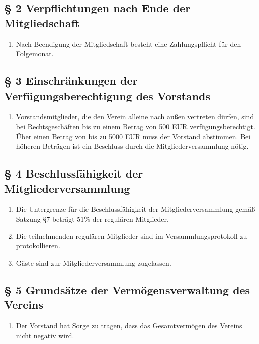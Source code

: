 \documentclass[10pt,a4paper]{article}
\begin{document}
%
%
\subsection*{§ 2 Verpflichtungen nach Ende der Mitgliedschaft}
\begin{enumerate}
\item Nach Beendigung der Mitgliedschaft besteht eine Zahlungspflicht für den Folgemonat.
\end{enumerate}
%
%
\subsection*{§ 3 Einschränkungen der Verfügungsberechtigung des Vorstands}
\begin{enumerate}
\item Vorstandsmitglieder, die den Verein alleine nach außen vertreten
    dürfen, sind bei Rechtsgeschäften bis zu einem Betrag von 500 EUR
    verfügungsberechtigt. Über einen Betrag von bis zu 5000 EUR muss der
    Vorstand abstimmen. Bei höheren Beträgen ist ein Beschluss durch die
    Mitgliederversammlung nötig.
\end{enumerate}
%
%
\subsection*{§ 4 Beschlussfähigkeit der Mitgliederversammlung}
\begin{enumerate}
\item Die Untergrenze für die Beschlussfähigkeit der Mitgliederversammlung
    gemäß Satzung §7 beträgt 51\% der regulären Mitglieder.
\item Die teilnehmenden regulären Mitglieder sind im Versammlungsprotokoll zu protokollieren.
\item Gäste sind zur Mitgliederversammlung zugelassen.

\end{enumerate}
%
%
\subsection*{§ 5 Grundsätze der Vermögensverwaltung des Vereins}
\begin{enumerate}
\item Der Vorstand hat Sorge zu tragen, dass das Gesamtvermögen des Vereins nicht negativ wird.
\end{enumerate}
\end{document}
